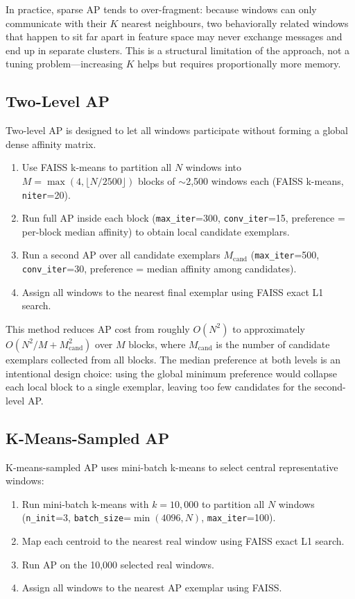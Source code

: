 \documentclass[11pt]{article}
\begin{document}
In practice, sparse AP tends to over-fragment: because windows can only communicate with their $K$ nearest neighbours, two behaviorally related windows that happen to sit far apart in feature space may never exchange messages and end up in separate clusters. This is a structural limitation of the approach, not a tuning problem---increasing $K$ helps but requires proportionally more memory.

\subsection{Two-Level AP}

Two-level AP is designed to let all windows participate without forming a global dense affinity matrix.

\begin{enumerate}
    \item Use FAISS k-means to partition all $N$ windows into $M = \max(4,\lfloor N/2500 \rfloor)$ blocks of $\sim$2,500 windows each (FAISS k-means, \texttt{niter}=20).
    \item Run full AP inside each block (\texttt{max\_iter}=300, \texttt{conv\_iter}=15, preference = per-block median affinity) to obtain local candidate exemplars.
    \item Run a second AP over all candidate exemplars $M_{\mathrm{cand}}$ (\texttt{max\_iter}=500, \texttt{conv\_iter}=30, preference = median affinity among candidates).
    \item Assign all windows to the nearest final exemplar using FAISS exact L1 search.
\end{enumerate}

This method reduces AP cost from roughly $O(N^2)$ to approximately $O(N^2/M + M_{\mathrm{cand}}^2)$ over $M$ blocks, where $M_{\mathrm{cand}}$ is the number of candidate exemplars collected from all blocks. The median preference at both levels is an intentional design choice: using the global minimum preference would collapse each local block to a single exemplar, leaving too few candidates for the second-level AP.

\subsection{K-Means-Sampled AP}

K-means-sampled AP uses mini-batch k-means to select central representative windows:

\begin{enumerate}
    \item Run mini-batch k-means with $k = 10{,}000$ to partition all $N$ windows (\texttt{n\_init}=3, \texttt{batch\_size}=$\min(4096, N)$, \texttt{max\_iter}=100).
    \item Map each centroid to the nearest real window using FAISS exact L1 search.
    \item Run AP on the 10,000 selected real windows.
    \item Assign all windows to the nearest AP exemplar using FAISS.
\end{enumerate}
\end{document}

